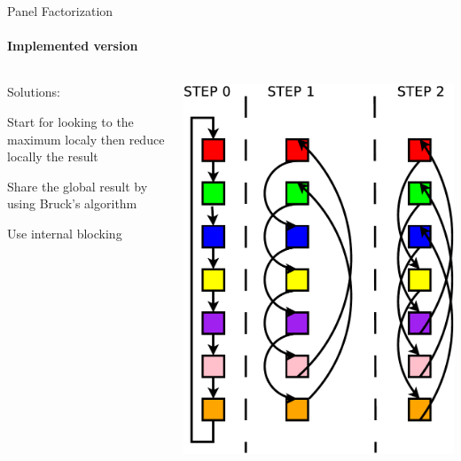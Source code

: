 \begin{frame}{Panel Factorization}
\framesubtitle{Implemented version}
\begin{columns}
\begin{column}{.60\textwidth}
Solutions:
\begin{itemize}
{
\item Start for looking to the maximum localy then reduce locally the result
}
\item Share the global result by using Bruck's algorithm
\item Use internal blocking
\end{itemize}
\end{column}
\hfill
\begin{column}{.30\textwidth}
\begin{center}
\includegraphics[scale=0.3]{bruck.pdf}
\end{center}
\end{column}
\end{columns}
\end{frame}

